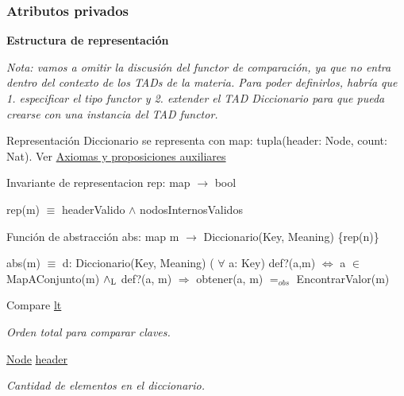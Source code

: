 \subsubsection*{\-Atributos privados}
\begin{Indent}{\bf \-Estructura de representación}\par
{\em \-Nota\-: vamos a omitir la discusión del functor de comparación, ya que no entra dentro del contexto de los \-T\-A\-Ds de la materia. \-Para poder definirlos, habría que 1. especificar el tipo functor y 2. extender el \-T\-A\-D \-Diccionario para que pueda crearse con una instancia del \-T\-A\-D functor.

\begin{DoxyParagraph}{\-Representación}
\-Diccionario se representa con map\-: tupla(header\-: Node, count\-: Nat). \-Ver \hyperlink{axiomas}{\-Axiomas y proposiciones auxiliares}
\end{DoxyParagraph}
\begin{DoxyParagraph}{\-Invariante de representacion}
rep\-: map $\to$ bool\par
 rep(m) $\equiv$ header\-Valido $\land$ nodos\-Internos\-Validos 
\end{DoxyParagraph}
\begin{DoxyParagraph}{\-Función de abstracción}
abs\-: map m $\to$ \-Diccionario(\-Key, \-Meaning) \{rep(n)\}\par
 abs(m) $\equiv$ d\-: \-Diccionario(\-Key, \-Meaning)  ( $\forall$ a\-: \-Key) def?(a,m) $\Leftrightarrow$ a $\in$ \-Map\-A\-Conjunto(m) $\land_{\rm L}$ def?(a, m) $\Rightarrow$ obtener(a, m) $=_{obs}$ \-Encontrar\-Valor(m)  
\end{DoxyParagraph}
}\begin{DoxyCompactItemize}
\item 
\-Compare \hyperlink{classaed2_1_1map_a0e5be36fae0693e4665bd2a615e7550a_a0e5be36fae0693e4665bd2a615e7550a}{lt}
\begin{DoxyCompactList}\small\item\em \-Orden total para comparar claves. \end{DoxyCompactList}\item 
\hyperlink{structaed2_1_1map_1_1Node}{\-Node} \hyperlink{classaed2_1_1map_a92d93f905c8ad73fba18fdc7e8915cce_a92d93f905c8ad73fba18fdc7e8915cce}{header}
\begin{DoxyCompactList}\small\item\em \-Cantidad de elementos en el diccionario. \end{DoxyCompactList}\end{DoxyCompactItemize}
\end{Indent}
